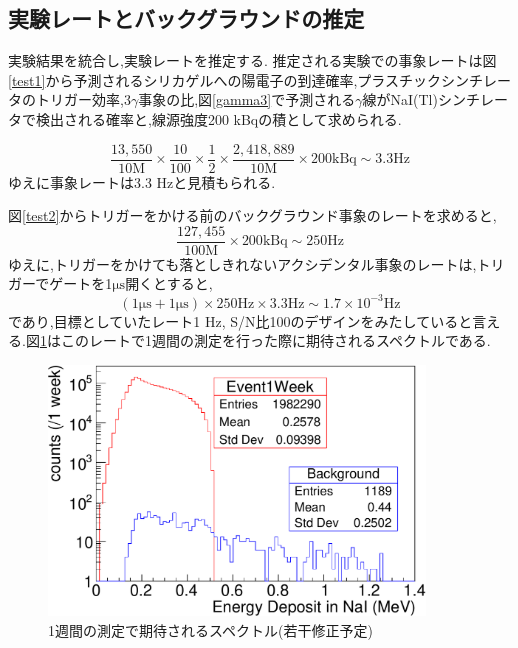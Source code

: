 \subsection{実験レートとバックグラウンドの推定}
実験結果を統合し,実験レートを推定する.
推定される実験での事象レートは図\ref{test1}から予測されるシリカゲルへの陽電子の到達確率,プラスチックシンチレータのトリガー効率,$3\gamma$事象の比,図\ref{gamma3}で予測される$\gamma$線がNaI(Tl)シンチレータで検出される確率と,線源強度200 kBqの積として求められる.

\begin{equation}
	\nonumber
	\frac{13,550}{10 \mathrm{M}} \times \frac{10}{100} \times \frac{1}{2} \times \frac{2,418,889}{10 \mathrm{M}} \times 200 \mathrm{kBq} \sim 3.3 \mathrm{Hz}
\end{equation}
ゆえに事象レートは3.3 Hzと見積もられる.

図\ref{test2}からトリガーをかける前のバックグラウンド事象のレートを求めると,
\begin{equation}
	\nonumber
	\frac{127,455}{100\mathrm{M}} \times 200 \mathrm{kBq} \sim 250 \mathrm{ Hz}
\end{equation}
ゆえに,トリガーをかけても落としきれないアクシデンタル事象のレートは,トリガーでゲートを1$\si{\micro \second}$開くとすると,
\begin{equation}
	\nonumber
	( 1 \si{\micro \second} + 1 \si{\micro \second}) \times  250 \mathrm{Hz} \times 3.3 \mathrm{Hz} \sim 1.7 \times 10^{-3} \mathrm{Hz}
\end{equation}
であり,目標としていたレート1 Hz, S/N比100のデザインをみたしていると言える.図\ref{test_all}はこのレートで1週間の測定を行った際に期待されるスペクトルである.

\begin{figure}[htbp]
	\centering
		\includegraphics[width=10cm]{fig/test_all.pdf}
	\caption{1週間の測定で期待されるスペクトル(若干修正予定)}
	\label{test_all}
\end{figure}

